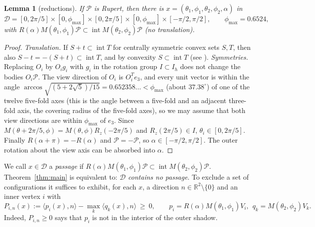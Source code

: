 \documentclass[11pt]{amsart}
\newtheorem{lemma}[theorem]{Lemma}
\theoremstyle{definition}
\newcommand{\R}{\mathbb{R}}
\newcommand{\sq}{\sqrt5}
\newcommand{\ip}[2]{\langle #1,#2\rangle}
\newcommand{\RID}{\mathcal{P}}
\newcommand{\Ih}{I_h}
\begin{document}
\begin{lemma}[reductions]\label{lem:reduce}
If $\RID$ is Rupert, then there is $x=(\theta_1,\phi_1,\theta_2,\phi_2,\alpha)$ in
\[
\mathcal{D}=[0,2\pi/5]\times[0,\phi_{\max}]\times[0,2\pi/5]\times[0,\phi_{\max}]\times[-\pi/2,\pi/2],
\qquad \phi_{\max}=0.6524,
\]
with $R(\alpha)M(\theta_1,\phi_1)\RID\subset\operatorname{int} M(\theta_2,\phi_2)\RID$ (no translation).
\end{lemma}
\begin{proof}
\emph{Translation.} If $S+t\subset\operatorname{int}T$ for centrally symmetric convex sets $S,T$, then also
$S-t=-(S+t)\subset\operatorname{int}T$, and by convexity $S\subset\operatorname{int}T$ (see \cite{SY25}).
\emph{Symmetries.} Replacing $O_i$ by $O_i g_i$ with $g_i$ in the rotation group $I\subset\Ih$ does not change the
bodies $O_i\RID$. The view direction of $O_i$ is $O_i^{T}e_3$, and every unit vector is within the angle
$\arccos\sqrt{(5+2\sq)/15}=0.652358\ldots<\phi_{\max}$ (about $37.38^\circ$) of one of the twelve five-fold axes (this is the angle between a
five-fold and an adjacent three-fold axis, the covering radius of the five-fold axes), so we may assume that both view
directions are within $\phi_{\max}$ of $e_3$. Since $M(\theta+2\pi/5,\phi)=M(\theta,\phi)R_z(-2\pi/5)$ and
$R_z(2\pi/5)\in I$, $\theta_i\in[0,2\pi/5]$. Finally $R(\alpha+\pi)=-R(\alpha)$ and $\RID=-\RID$, so
$\alpha\in[-\pi/2,\pi/2]$. The outer rotation about the view axis can be absorbed into $\alpha$.
\end{proof}

We call $x\in\mathcal D$ a \emph{passage} if $R(\alpha)M(\theta_1,\phi_1)\RID\subset\operatorname{int}M(\theta_2,\phi_2)\RID$.
Theorem~\ref{thm:main} is equivalent to: \emph{$\mathcal{D}$ contains no passage}. To exclude a set of
configurations it suffices to exhibit, for each $x$, a direction $n\in\R^2\setminus\{0\}$ and an inner vertex $i$ with
\begin{equation}\label{eq:protrusion}
  P_{i,n}(x):=\ip{p_i(x)}{n}-\max_k\ip{q_k(x)}{n}\ \ge\ 0,\qquad p_i=R(\alpha)M(\theta_1,\phi_1)V_i,\ \ q_k=M(\theta_2,\phi_2)V_k .
\end{equation}
Indeed, $P_{i,n}\ge0$ says that $p_i$ is not in the interior of the outer shadow.
\end{document}
